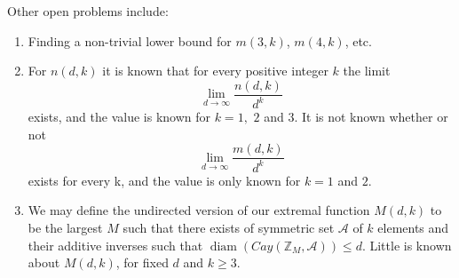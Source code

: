 \documentclass[11pt]{article}
\theoremstyle{definition}
\def\Z{\mbox{$\mathbb Z$}}
\def\diam{\operatorname{diam}}
\begin{document}
 Other open problems include: 
\begin{enumerate}[\bf 1.]
\item  Finding a non-trivial lower bound for $m(3,k)$, $m(4,k)$, etc.

\item  For $n(d,k)$ it is known that for every positive integer $k$ the limit 
\[
\lim_{d \to \infty}{\frac{n(d,k)}{d^k}}
\]
exists, and the value is known for $k = 1,$ $2$ and $3$.  It is not known whether or not 
\[
\lim_{d \to \infty}{\frac{m(d,k)}{d^k}}
\]
exists for every k, and the value is only known for $k = 1$ and $2$. \\

\item  We may define the undirected version of our extremal function $M(d,k)$ to be the largest $M$ such that there exists of symmetric set $\mathscr{A}$ of $k$ elements and their additive inverses such that $\diam(Cay(\Z_M,\mathscr{A})) \leq d$.  Little is known about $M(d,k)$, for fixed $d$ and $k \geq 3$. \\
\end{enumerate}

	
		
\end{document}
